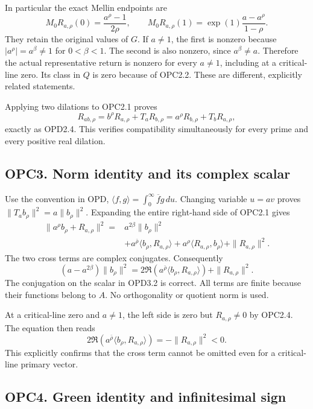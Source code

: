 In particular the exact Mellin endpoints are \[
\boxed{
M_0R_{a,\rho}(0)=\frac{a^\rho-1}{2\rho},\qquad
M_0R_{a,\rho}(1)=\exp(1)\frac{a-a^\rho}{1-\rho}.}
\tag{OPC2.4}
\] They retain the original values of \(G\). If \(a\ne1\), the first is
nonzero because \(|a^\rho|=a^\beta\ne1\) for \(0<\beta<1\). The second
is also nonzero, since \(a^\beta\ne a\). Therefore the actual
representative return is nonzero for every \(a\ne1\), including at a
critical-line zero. Its class in \(Q\) is zero because of OPC2.2. These
are different, explicitly related statements.

Applying two dilations to OPC2.1 proves \[
R_{ab,\rho}=b^\rho R_{a,\rho}+T_aR_{b,\rho}
=a^\rho R_{b,\rho}+T_bR_{a,\rho},
\tag{OPC2.5}
\] exactly as OPD2.4. This verifies compatibility simultaneously for
every prime and every positive real dilation.

\subsection{OPC3. Norm identity and its complex
scalar}\label{opc3.-norm-identity-and-its-complex-scalar}

Use the convention in OPD,
\(\langle f,g\rangle=\int_0^\infty\overline f g\,du\). Changing variable
\(u=av\) proves \(\|T_ab_\rho\|^2=a\|b_\rho\|^2\). Expanding the entire
right-hand side of OPC2.1 gives \[
\begin{aligned}
\|a^\rho b_\rho+R_{a,\rho}\|^2
={}&a^{2\beta}\|b_\rho\|^2\\
&+a^{\bar\rho}\langle b_\rho,R_{a,\rho}\rangle
+a^\rho\langle R_{a,\rho},b_\rho\rangle
+\|R_{a,\rho}\|^2.
\end{aligned}
\] The two cross terms are complex conjugates. Consequently \[
(a-a^{2\beta})\|b_\rho\|^2
=2\Re\!\left(a^{\bar\rho}\langle b_\rho,R_{a,\rho}\rangle\right)
+\|R_{a,\rho}\|^2.
\tag{OPC3.1}
\] The conjugation on the scalar in OPD3.2 is correct. All terms are
finite because their functions belong to \(A\). No orthogonality or
quotient norm is used.

At a critical-line zero and \(a\ne1\), the left side is zero but
\(R_{a,\rho}\ne0\) by OPC2.4. The equation then reads \[
2\Re\!\left(a^{\bar\rho}\langle b_\rho,R_{a,\rho}\rangle\right)
=-\|R_{a,\rho}\|^2<0.
\tag{OPC3.2}
\] This explicitly confirms that the cross term cannot be omitted even
for a critical-line primary vector.

\subsection{OPC4. Green identity and infinitesimal
sign}\label{opc4.-green-identity-and-infinitesimal-sign}

